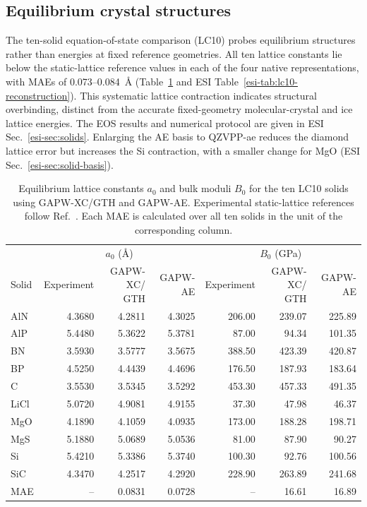 \documentclass[10pt,a4paper,twocolumn]{article}
\newcommand{\GTH}{GTH}
\begin{document}
\subsection{Equilibrium crystal structures}
\label{sec:structure-results}

The ten-solid equation-of-state comparison (LC10) probes equilibrium structures rather than energies at fixed reference geometries. All ten lattice constants lie below the static-lattice reference values in each of the four native representations, with MAEs of 0.073--0.084~\AA{} (Table~\ref{tab:lc10-primary} and ESI Table~\ref{esi-tab:lc10-reconstruction}). This systematic lattice contraction indicates structural overbinding, distinct from the accurate fixed-geometry molecular-crystal and ice lattice energies. The EOS results and numerical protocol are given in ESI Sec.~\ref{esi-sec:solids}. Enlarging the AE basis to QZVPP-ae reduces the diamond lattice error but increases the Si contraction, with a smaller change for MgO (ESI Sec.~\ref{esi-sec:solid-basis}).

\begin{table}[t]
\centering\small
\caption{Equilibrium lattice constants $a_0$ and bulk moduli $B_0$ for the ten LC10 solids using GAPW-XC/GTH and GAPW-AE. Experimental static-lattice references follow Ref.~. Each MAE is calculated over all ten solids in the unit of the corresponding column.}
\label{tab:lc10-primary}
\begin{tabular}{lrrrrrr}
\toprule
& \multicolumn{3}{c}{$a_0$ (\AA{})} & \multicolumn{3}{c}{$B_0$ (GPa)} \\
\cmidrule(lr){2-4}\cmidrule(lr){5-7}
Solid & Experiment & \shortstack{GAPW-XC/\\GTH} & GAPW-AE & Experiment & \shortstack{GAPW-XC/\\GTH} & GAPW-AE \\
\midrule
AlN & 4.3680 & 4.2811 & 4.3025 & 206.00 & 239.07 & 225.89 \\
AlP & 5.4480 & 5.3622 & 5.3781 & 87.00 & 94.34 & 101.35 \\
BN & 3.5930 & 3.5777 & 3.5675 & 388.50 & 423.39 & 420.87 \\
BP & 4.5250 & 4.4439 & 4.4696 & 176.50 & 187.93 & 183.64 \\
C & 3.5530 & 3.5345 & 3.5292 & 453.30 & 457.33 & 491.35 \\
LiCl & 5.0720 & 4.9081 & 4.9155 & 37.30 & 47.98 & 46.37 \\
MgO & 4.1890 & 4.1059 & 4.0935 & 173.00 & 188.28 & 198.71 \\
MgS & 5.1880 & 5.0689 & 5.0536 & 81.00 & 87.90 & 90.27 \\
Si & 5.4210 & 5.3386 & 5.3740 & 100.30 & 92.76 & 100.56 \\
SiC & 4.3470 & 4.2517 & 4.2920 & 228.90 & 263.89 & 241.68 \\
\midrule
MAE & -- & 0.0831 & 0.0728 & -- & 16.61 & 16.89 \\
\bottomrule
\end{tabular}
\end{table}
\end{document}
